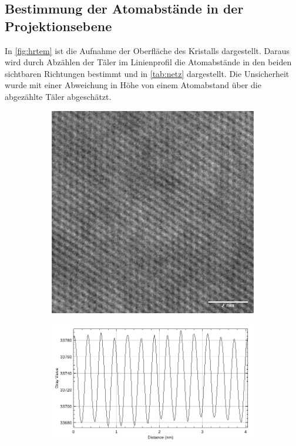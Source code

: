  \subsection{Bestimmung der Atomabstände in der Projektionsebene}

 In \cref{fig:hrtem} ist die Aufnahme der Oberfläche des Kristalls dargestellt.
 Daraus wird durch Abzählen der Täler im Linienprofil die Atomabstände in den beiden sichtbaren Richtungen bestimmt und in \cref{tab:netz} dargestellt.
 Die Unsicherheit wurde mit einer Abweichung in Höhe von einem Atomabstand über die abgezählte Täler abgeschätzt.

	\begin{figure}[H]
		\centering
	\begin{subfigure}[b]{0.45\textwidth}
				\includegraphics[width= 1 \linewidth]{img/hrtem_zoomzoom}
				\caption{}
        \label{fig:hrtem_img}
		\end{subfigure}
	\begin{subfigure}[b]{0.45\textwidth}
				\includegraphics[width= 1 \linewidth]{img/tem_line-Plot_hrtem_orig}

\end{subfigure}
\end{figure}
